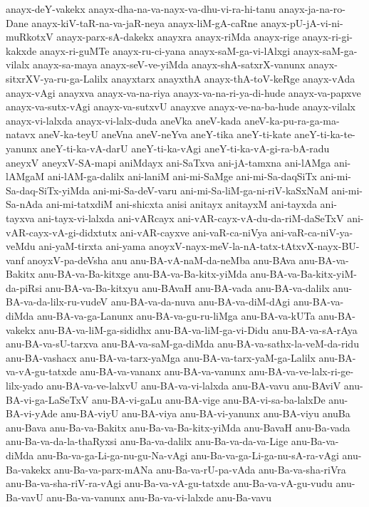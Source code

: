 {anayx-deY-vakekx
anayx-dha-na-va-nayx-va-dhu-vi-ra-hi-tanu
anayx-ja-na-ro-Dane
anayx-kiV-taR-na-va-jaR-neya
anayx-liM-gA-caRne
anayx-pU-jA-vi-ni-muRkotxV
anayx-parx-sA-dakekx
anayxra
anayx-riMda
anayx-rige
anayx-ri-gi-kakxde
anayx-ri-guMTe
anayx-ru-ci-yana
anayx-saM-ga-vi-lAlxgi
anayx-saM-ga-vilalx
anayx-sa-maya
anayx-seV-ve-yiMda
anayx-shA-satxrX-vanunx
anayx-sitxrXV-ya-ru-ga-Lalilx
anayxtarx
anayxthA
anayx-thA-toV-keRge
anayx-vAda
anayx-vAgi
anayxva
anayx-va-na-riya
anayx-va-na-ri-ya-di-hude
anayx-va-papxve
anayx-va-sutx-vAgi
anayx-va-sutxvU
anayxve
anayx-ve-na-ba-hude
anayx-vilalx
anayx-vi-lalxda
anayx-vi-lalx-duda
aneVka
aneV-kada
aneV-ka-pu-ra-ga-ma-natavx
aneV-ka-teyU
aneVna
aneV-neYva
aneY-tika
aneY-ti-kate
aneY-ti-ka-te-yanunx
aneY-ti-ka-vA-darU
aneY-ti-ka-vAgi
aneY-ti-ka-vA-gi-ra-bA-radu
aneyxV
aneyxV-SA-mapi
aniMdayx
ani-SaTxva
ani-jA-tamxna
ani-lAMga
ani-lAMgaM
ani-lAM-ga-dalilx
ani-laniM
ani-mi-SaMge
ani-mi-Sa-daqSiTx
ani-mi-Sa-daq-SiTx-yiMda
ani-mi-Sa-deV-varu
ani-mi-Sa-liM-ga-ni-riV-kaSxNaM
ani-mi-Sa-nAda
ani-mi-tatxdiM
ani-shicxta
anisi
anitayx
anitayxM
ani-tayxda
ani-tayxva
ani-tayx-vi-lalxda
ani-vARcayx
ani-vAR-cayx-vA-du-da-riM-daSeTxV
ani-vAR-cayx-vA-gi-didxtutx
ani-vAR-cayxve
ani-vaR-ca-niVya
ani-vaR-ca-niV-ya-veMdu
ani-yaM-tirxta
ani-yama
anoyxV-nayx-meV-la-nA-tatx-tAtxvX-nayx-BU-vanf
anoyxV-pa-deVsha
anu
anu-BA-vA-naM-da-neMba
anu-BAva
anu-BA-va-Bakitx
anu-BA-va-Ba-kitxge
anu-BA-va-Ba-kitx-yiMda
anu-BA-va-Ba-kitx-yiM-da-piRsi
anu-BA-va-Ba-kitxyu
anu-BAvaH
anu-BA-vada
anu-BA-va-dalilx
anu-BA-va-da-lilx-ru-vudeV
anu-BA-va-da-nuva
anu-BA-va-diM-dAgi
anu-BA-va-diMda
anu-BA-va-ga-Lanunx
anu-BA-va-gu-ru-liMga
anu-BA-va-kUTa
anu-BA-vakekx
anu-BA-va-liM-ga-sididhx
anu-BA-va-liM-ga-vi-Didu
anu-BA-va-sA-rAya
anu-BA-va-sU-tarxva
anu-BA-va-saM-ga-diMda
anu-BA-va-sathx-la-veM-da-ridu
anu-BA-vashacx
anu-BA-va-tarx-yaMga
anu-BA-va-tarx-yaM-ga-Lalilx
anu-BA-va-vA-gu-tatxde
anu-BA-va-vananx
anu-BA-va-vanunx
anu-BA-va-ve-lalx-ri-ge-lilx-yado
anu-BA-va-ve-lalxvU
anu-BA-va-vi-lalxda
anu-BA-vavu
anu-BAviV
anu-BA-vi-ga-LaSeTxV
anu-BA-vi-gaLu
anu-BA-vige
anu-BA-vi-sa-ba-lalxDe
anu-BA-vi-yAde
anu-BA-viyU
anu-BA-viya
anu-BA-vi-yanunx
anu-BA-viyu
anuBa
anu-Bava
anu-Ba-va-Bakitx
anu-Ba-va-Ba-kitx-yiMda
anu-BavaH
anu-Ba-vada
anu-Ba-va-da-la-thaRyxsi
anu-Ba-va-dalilx
anu-Ba-va-da-va-Lige
anu-Ba-va-diMda
anu-Ba-va-ga-Li-ga-nu-gu-Na-vAgi
anu-Ba-va-ga-Li-ga-nu-sA-ra-vAgi
anu-Ba-vakekx
anu-Ba-va-parx-mANa
anu-Ba-va-rU-pa-vAda
anu-Ba-va-sha-riVra
anu-Ba-va-sha-riV-ra-vAgi
anu-Ba-va-vA-gu-tatxde
anu-Ba-va-vA-gu-vudu
anu-Ba-vavU
anu-Ba-va-vanunx
anu-Ba-va-vi-lalxde
anu-Ba-vavu
}
